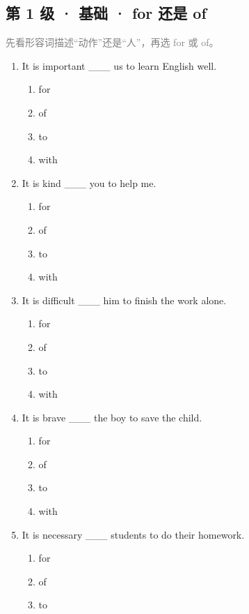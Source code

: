\documentclass[11pt,a4paper]{ctexart}
\begin{document}
\subsection*{第 1 级 · 基础 · for 还是 of}
\noindent\textcolor{gray}{先看形容词描述“动作”还是“人”，再选 for 或 of。}\par\smallskip
\begin{enumerate}[leftmargin=*,itemsep=4pt]
\item It is important \_\_\_ us to learn English well.
\begin{enumerate}[label=\Alph*.,leftmargin=2em,itemsep=1pt,topsep=2pt]
\item for
\item of
\item to
\item with
\end{enumerate}
\item It is kind \_\_\_ you to help me.
\begin{enumerate}[label=\Alph*.,leftmargin=2em,itemsep=1pt,topsep=2pt]
\item for
\item of
\item to
\item with
\end{enumerate}
\item It is difficult \_\_\_ him to finish the work alone.
\begin{enumerate}[label=\Alph*.,leftmargin=2em,itemsep=1pt,topsep=2pt]
\item for
\item of
\item to
\item with
\end{enumerate}
\item It is brave \_\_\_ the boy to save the child.
\begin{enumerate}[label=\Alph*.,leftmargin=2em,itemsep=1pt,topsep=2pt]
\item for
\item of
\item to
\item with
\end{enumerate}
\item It is necessary \_\_\_ students to do their homework.
\begin{enumerate}[label=\Alph*.,leftmargin=2em,itemsep=1pt,topsep=2pt]
\item for
\item of
\item to

\end{enumerate}
\end{enumerate}
\end{document}
